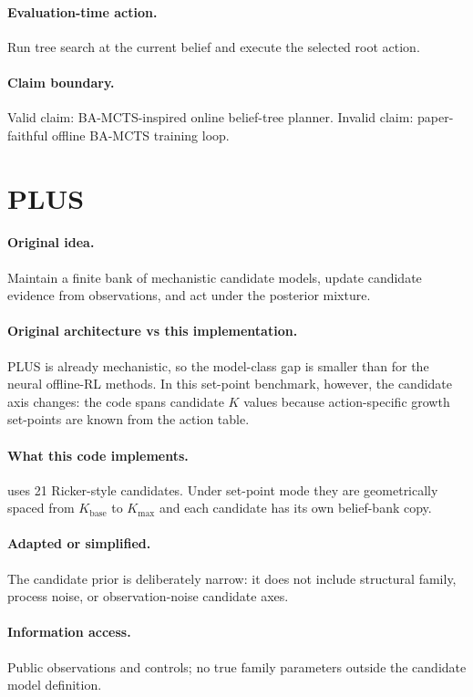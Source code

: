 \documentclass[11pt]{article}
\begin{document}
\paragraph{Evaluation-time action.}
Run tree search at the current belief and execute the selected root action.

\paragraph{Claim boundary.}
Valid claim: BA-MCTS-inspired online belief-tree planner. Invalid claim:
paper-faithful offline BA-MCTS training loop.

\section{PLUS}

\paragraph{Original idea.}
Maintain a finite bank of mechanistic candidate models, update candidate
evidence from observations, and act under the posterior mixture.

\paragraph{Original architecture vs this implementation.}
PLUS is already mechanistic, so the model-class gap is smaller than for the
neural offline-RL methods. In this set-point benchmark, however, the candidate
axis changes: the code spans candidate $K$ values because action-specific
growth set-points are known from the action table.

\paragraph{What this code implements.}
 uses 21 Ricker-style candidates. Under set-point mode they are
geometrically spaced from $K_{\mathrm{base}}$ to $K_{\max}$ and each candidate
has its own belief-bank copy.

\paragraph{Adapted or simplified.}
The candidate prior is deliberately narrow: it does not include structural
family, process noise, or observation-noise candidate axes.

\paragraph{Information access.}
Public observations and controls; no true family parameters outside the
candidate model definition.
\end{document}
